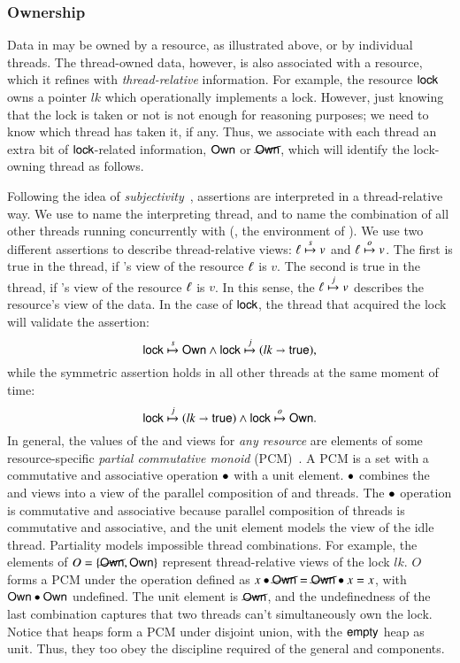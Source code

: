 \subsubsection{Ownership}
\label{sec:ownership}
Data in \SCST may be owned by a resource, as illustrated above, or by
individual threads. The thread-owned data, however, is also
associated with a resource, which it refines with \emph{thread-relative} information.
%
For example, the resource $\mathsf{lock}$ owns a pointer $lk$ which
operationally implements a lock. However, just knowing that the lock
is taken or not is not enough for reasoning purposes; we need to
know which thread has taken it, if any. Thus, we
associate with each thread an extra bit of $\mathsf{lock}$-related
information, $\mathsf{Own}$ or $\cancel{\mathsf{Own}}$, which will identify the
lock-owning thread as follows. 

Following the idea of
\emph{subjectivity}~\cite{LeyWild-Nanevski:POPL13}, \SCST assertions
are interpreted in a thread-relative way. We use \self to name the
interpreting thread, and \other to name the combination of all other
threads running concurrently with \self (\ie, the environment of
\self). We use two different assertions to describe thread-relative
views: $\ell \mathrel{\overset{s}{\mapsto}} v$ and $\ell \mathrel{\overset{o}{\mapsto}} v$. The first is true in
the \self thread, if \self's view of the resource $\ell$ is
$v$. The second is true in the \self thread, if \other's view of the
resource $\ell$ is $v$.
%
In this sense, the $\ell \mathrel{\overset{j}{\mapsto}} v$ describes the resource's view of
the data.
%
%
In the case of $\mathsf{lock}$, the thread that acquired the lock will
validate the assertion:
\[
{\small
\hlock \spts \lockOwn \aand \hlock \jpts (lk \hpts \mathsf{true}),
}
\]
%
while the symmetric assertion holds in all other threads at the same
moment of time:
\[
{\small
\hlock \jpts (lk \hpts \mathsf{true}) \aand \hlock \opts \lockOwn.
}\]
%
In general, the values of the \self and \other views for \emph{any
  resource} are elements of some resource-specific \emph{partial
  commutative monoid} (PCM)~\cite{LeyWild-Nanevski:POPL13}. A PCM is a
set with a commutative and associative operation $\bullet$ with a unit
element. $\bullet$ combines the \self and \other views into a view of
the parallel composition of \self and \other threads. The $\bullet$
operation is commutative and associative because parallel composition
of threads is commutative and associative, and the unit element models
the view of the idle thread. Partiality models impossible thread
combinations.
%
For example, the elements of $O = \{\cancel{\mathsf{Own}}, \mathsf{Own}\}$ represent
thread-relative views of the lock $lk$. $O$ forms a PCM under the
operation defined as $x \bullet \cancel{\mathsf{Own}} = \cancel{\mathsf{Own}} \bullet x = x$, with
$\mathsf{Own} \bullet \mathsf{Own}$ undefined. The unit element is $\cancel{\mathsf{Own}}$,
and the undefinedness of the last combination captures that two
threads can't simultaneously own the lock. Notice that heaps form a
PCM under disjoint union, with the $\mathsf{empty}$ heap as unit. Thus, they
too obey the discipline required of the general \self and \other
components. 
%


